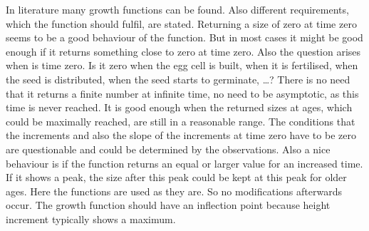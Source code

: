 \documentclass[a4paper,twocolumn]{article}
\begin{document}
In literature many growth functions can be found. Also different
requirements, which the function should fulfil, are stated. Returning
a size of zero at time zero seems to be a good behaviour of the
function. But in most cases it might be good enough if it returns
something close to zero at time zero. Also the question arises when is
time zero. Is it zero when the egg cell is built, when it is
fertilised, when the seed is distributed, when the seed starts to
germinate, \dots? There is no need that it returns a finite number at
infinite time, no need to be asymptotic, as this time is never
reached. It is good enough when the returned sizes at ages, which could
be maximally reached, are still in a reasonable range. The conditions
that the increments and also the slope of the increments at time
zero have to be zero are questionable and could be determined by the
observations. Also a nice behaviour is if the function returns an
equal or larger value for an increased time. If it shows a
peak, the size after this peak could be kept at this peak for older
ages. Here the functions are used as they are. So no
modifications afterwards occur.  The growth function should have an
inflection point because height increment typically shows a maximum.
\end{document}
